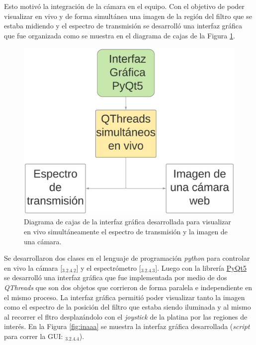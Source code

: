 Esto motivó la integración de la cámara en el equipo. Con el objetivo de poder visualizar en vivo y de forma simultánea una imagen de la región del filtro que se estaba midiendo y el espectro de transmisión se desarrolló una interfaz gráfica que fue organizada como se muestra en el diagrama de cajas de la Figura \ref{fig:diagcajas}.

\begin{figure}[H]
	\centering
	\includegraphics[scale=0.5]{Figs/microespectrometro/interfazespcam.png}
	\caption{Diagrama de cajas de la interfaz gráfica desarrollada para visualizar en vivo simultáneamente el espectro de transmisión y la imagen de una cámara.}
	\label{fig:diagcajas}
\end{figure}

Se desarrollaron dos clases en el lenguaje de programación \textit{python} para controlar en vivo la cámara [\href{https://github.com/jrr1984/defectsGUI/blob/master/views.py}{\faGithub$_{3.2.4.2}$}] y el espectrómetro [\href{https://github.com/jrr1984/defectsGUI/blob/master/Spectrometer.py}{\faGithub$_{3.2.4.3}$}]. Luego con la librería \href{https://pypi.org/project/PyQt5/}{PyQt5} se desarrolló una interfaz gráfica que fue implementada por medio de dos \textit{QThreads} que son dos objetos que corrieron de forma paralela e independiente en el mismo proceso. La interfaz gráfica permitió poder visualizar tanto la imagen como el espectro de la posición del filtro que estaba siendo iluminada y al mismo al recorrer el fltro desplazándolo con el \textit{joystick} de la platina por las regiones de interés. En la Figura \ref{fig:inaaa} se muestra la interfaz gráfica desarrollada (\textit{script} para correr la GUI: \href{https://github.com/jrr1984/defectsGUI/blob/master/start.py}{\faGithub$_{3.2.4.4}$}).

